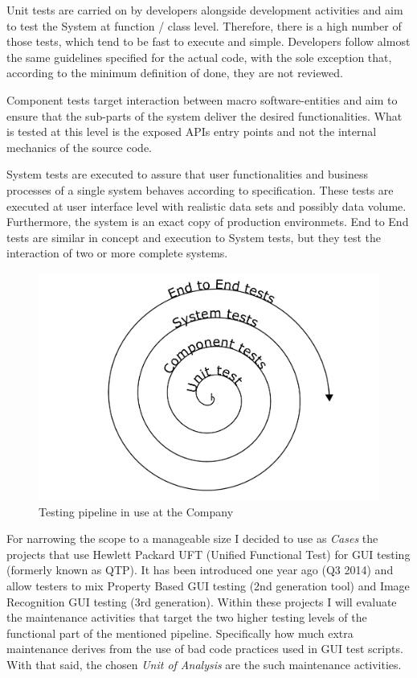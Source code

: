 Unit tests are carried on by developers alongside development activities and aim to test the System at function / class level. Therefore, there is a high number of those tests, which tend to be fast to execute and simple. Developers follow almost the same guidelines specified for the actual code, with the sole exception that, according to the minimum definition of done, they are not reviewed.

Component tests target interaction between macro software-entities and aim to ensure that the sub-parts of the system deliver the desired functionalities. What is tested at this level is the exposed APIs entry points and not the internal mechanics of the source code.

System tests are executed to assure that user functionalities and business processes of a single system behaves according to specification. These tests are executed at user interface level with realistic data sets and possibly data volume. Furthermore, the system is an exact copy of production environmets. End to End tests are similar in concept and execution to System tests, but they test the interaction of two or more complete systems.


\begin{figure}[ht]
    \centering
    \includegraphics[width=\textwidth]{figure/testing_pipeline.pdf}
    \caption{Testing pipeline in use at the Company}
    \label{fig:testing_pipeline}
\end{figure}

For narrowing the scope to a manageable size I decided to use as \textit{Cases} the projects that use Hewlett Packard UFT (Unified Functional Test) for GUI testing (formerly known as QTP). It has been introduced one year ago (Q3 2014) and allow testers to mix Property Based GUI testing (2nd generation tool) and Image Recognition GUI testing (3rd generation). Within these projects I will evaluate the maintenance activities that target the two higher testing levels of the functional part of the mentioned pipeline. Specifically how much extra maintenance derives from the use of bad code practices used in GUI test scripts. With that said, the chosen \textit{Unit of Analysis} are the such maintenance activities. 
    

